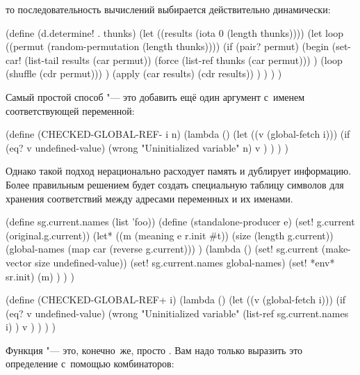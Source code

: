 \noindent
то последовательность вычислений выбирается действительно динамически:

\begin{code:lisp}
(define (d.determine! . thunks)
  (let ((results (iota 0 (length thunks))))
    (let loop ((permut (random-permutation (length thunks))))
      (if (pair? permut)
          (begin (set-car! (list-tail results (car permut))
                           (force (list-ref thunks (car permut))) )
                 (loop (shuffle (cdr permut))) )
          (apply (car results) (cdr results)) ) ) ) )
\end{code:lisp}

\endgroup %




Самый простой способ "--- это добавить  ещё один аргумент
с~именем соответствующей переменной:

\begin{code:lisp}
(define (CHECKED-GLOBAL-REF- i n)
  (lambda ()
    (let ((v (global-fetch i)))
      (if (eq? v undefined-value)
          (wrong "Uninitialized variable" n)
          v ) ) ) )
\end{code:lisp}

Однако такой подход нерационально расходует память и дублирует информацию. Более
правильным решением будет создать специальную таблицу символов для хранения
соответствий между адресами переменных и их именами.

\begin{code:lisp}
(define sg.current.names (list 'foo))
(define (standalone-producer e)
  (set! g.current (original.g.current))
  (let* ((m (meaning e r.init #t))
         (size (length g.current))
         (global-names (map car (reverse g.current))) )
    (lambda ()
      (set! sg.current (make-vector size undefined-value))
      (set! sg.current.names global-names)
      (set! *env* sr.init)
      (m) ) ) )

(define (CHECKED-GLOBAL-REF+ i)
  (lambda ()
    (let ((v (global-fetch i)))
      (if (eq? v undefined-value)
          (wrong "Uninitialized variable"
                 (list-ref sg.current.names i) )
          v ) ) ) )
\end{code:lisp}



Функция  "--- это, конечно~же, просто . Вам надо
только выразить это определение с~помощью комбинаторов:

